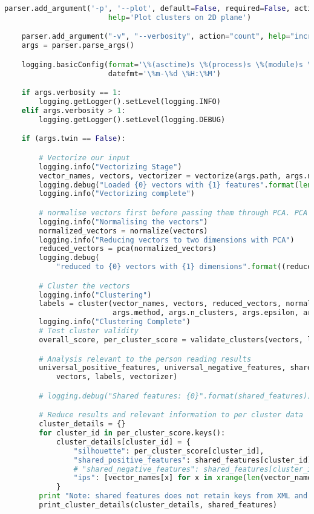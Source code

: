 \begin{lstlisting}[language=python]
    parser.add_argument('-p', '--plot', default=False, required=False, action='store_true',
                        help='Plot clusters on 2D plane')

    parser.add_argument("-v", "--verbosity", action="count", help="increase output verbosity")
    args = parser.parse_args()

    logging.basicConfig(format='\%(asctime)s \%(process)s \%(module)s \%(funcName)s \%(levelname)-8s :\%(message)s',
                        datefmt='\%m-\%d \%H:\%M')

    if args.verbosity == 1:
        logging.getLogger().setLevel(logging.INFO)
    elif args.verbosity > 1:
        logging.getLogger().setLevel(logging.DEBUG)

    if (args.twin == False):

        # Vectorize our input
        logging.info("Vectorizing Stage")
        vector_names, vectors, vectorizer = vectorize(args.path, args.nessus)
        logging.debug("Loaded {0} vectors with {1} features".format(len(vector_names), vectors.shape[1]))
        logging.info("Vectorizing complete")

        # normalise vectors first before passing them through PCA. PCA uses 2 dimensions
        logging.info("Normalising the vectors")
        normalized_vectors = normalize(vectors)
        logging.info("Reducing vectors to two dimensions with PCA")
        reduced_vectors = pca(normalized_vectors)
        logging.debug(
            "reduced to {0} vectors with {1} dimensions".format((reduced_vectors.shape[0]), reduced_vectors.shape[1]))

        # Cluster the vectors
        logging.info("Clustering")
        labels = cluster(vector_names, vectors, reduced_vectors, normalized_vectors, vectorizer, args.strategy,
                         args.method, args.n_clusters, args.epsilon, args.min_samples, args.metric)
        logging.info("Clustering Complete")
        # Test cluster validity
        overall_score, per_cluster_score = validate_clusters(vectors, labels)

        # Analysis relevant to the person reading results
        universal_positive_features, universal_negative_features, shared_features = get_common_features_from_cluster(
            vectors, labels, vectorizer)

        # logging.debug("Shared features: {0}".format(shared_features))

        # Reduce results and relevant information to per cluster data
        cluster_details = {}
        for cluster_id in per_cluster_score.keys():
            cluster_details[cluster_id] = {
                "silhouette": per_cluster_score[cluster_id],
                "shared_positive_features": shared_features[cluster_id]['positive'],
                # "shared_negative_features": shared_features[cluster_id]['negative'],
                "ips": [vector_names[x] for x in xrange(len(vector_names)) if labels[x] == cluster_id]
            }
        print "Note: shared features does not retain keys from XML and therefore wont always be human readable."
        print_cluster_details(cluster_details, shared_features)


\end{lstlisting}
